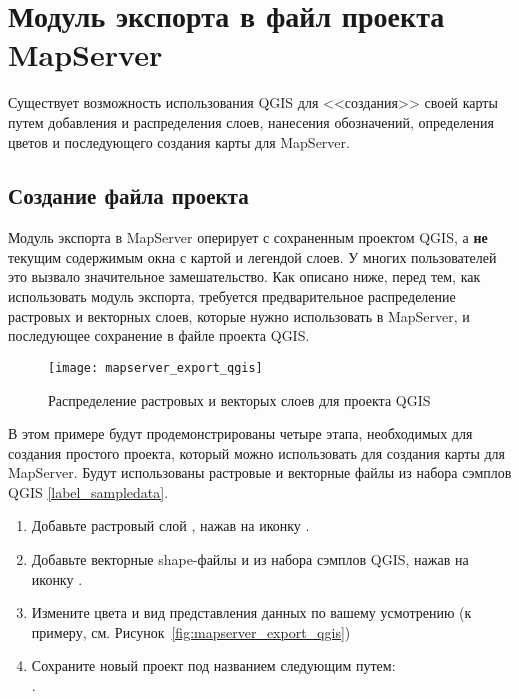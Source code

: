 
\section{Модуль экспорта в файл проекта MapServer}\label{sec:mapserver_export}


Существует возможность использования QGIS для <<создания>> своей карты
путем добавления и распределения слоев, нанесения обозначений,
определения цветов и последующего создания карты для MapServer.

\subsection{Создание файла проекта}

Модуль экспорта в MapServer оперирует с сохраненным проектом QGIS, а
\textbf{не} текущим содержимым окна с картой и легендой слоев. У
многих пользователей это вызвало значительное замешательство. Как
описано ниже, перед тем, как использовать модуль экспорта, требуется
предварительное распределение растровых и векторных слоев, которые нужно
использовать в MapServer, и последующее сохранение в файле проекта QGIS.

\begin{figure}[ht]
\centering
  \texttt{[image: mapserver\_export\_qgis]}
   \caption{Распределение растровых и векторых слоев для проекта QGIS \nixcaption}
  \label{fig:mapserver_export_qgs}
\end{figure}

В этом примере будут продемонстрированы четыре этапа, необходимых для
создания простого проекта, который можно использовать для создания карты
для MapServer. Будут использованы растровые и векторные файлы из набора
сэмплов QGIS \ref{label_sampledata}.

\begin{enumerate}
\item Добавьте растровый слой , нажав на иконку
.
\item Добавьте векторные shape-файлы 
и  из набора сэмплов QGIS, нажав на иконку
.
\item Измените цвета и вид представления данных по вашему усмотрению
(к примеру, см. Рисунок~\ref{fig:mapserver_export_qgis})
\item Сохраните новый проект под названием 
следующим путем: \\
 \arrow {}.
\end{enumerate}

